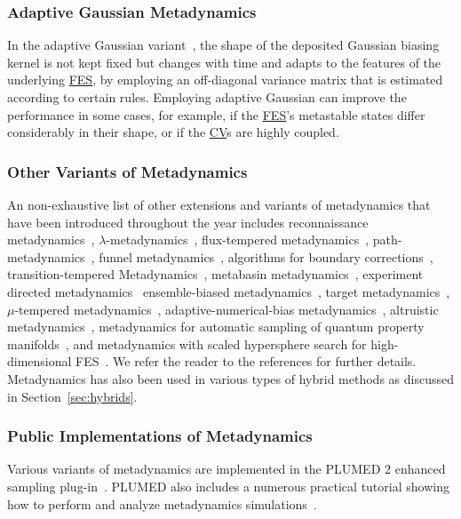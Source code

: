 \documentclass[9pt,review]{livecoms}
\begin{document}
\subsubsection{Adaptive Gaussian Metadynamics}
In the adaptive Gaussian variant~\cite{Branduardi-JCTC-2012}, the shape of the deposited Gaussian biasing kernel is not kept fixed but changes with time and adapts to the features of the underlying \hyperlink{ref:FES} {FES}, by employing an off-diagonal variance matrix that is estimated according to certain rules. Employing adaptive Gaussian can improve the performance in some cases, for example, if the \hyperlink{ref:FES} {FES}'s metastable states differ considerably in their shape, or if the \hyperlink{ref:CV} {CV}s are highly coupled.

\subsubsection{Other Variants of Metadynamics}
\label{sec:metad_variants}
An non-exhaustive list of other extensions and variants of metadynamics that have been introduced throughout the year includes
reconnaissance metadynamics~\cite{10.1073/pnas.1011511107},
$\lambda$-metadynamics~\cite{10.1021/jz200808x},
flux-tempered metadynamics~\cite{Singh-JStatPhys-2011,Singh-JCTC-2012},
path-metadynamics~\cite{10.1103/physrevlett.109.020601,10.1063/1.5027392},
funnel metadynamics~\cite{10.1073/pnas.1303186110,10.1038/s41596-020-0342-4},
algorithms for boundary corrections~\cite{McGovern-JCP-2013},
transition-tempered Metadynamics~\cite{Dama-JCTC-2014}, metabasin metadynamics~\cite{10.1021/acs.jctc.5b00907},
experiment directed metadynamics~\cite{White_EDM_2015}
ensemble-biased metadynamics~\cite{Marinelli_EnsembleBiased_2015},
target metadynamics~\cite{GilLey_TargetMetaD_2016},
$\mu$-tempered metadynamics~\cite{10.1063/1.4937939},
adaptive-numerical-bias metadynamics~\cite{10.1002/jcc.25066},
altruistic metadynamics~\cite{10.1021/acs.jpcb.6b00087,10.1063/1.4978939},
metadynamics for automatic sampling of quantum property manifolds~\cite{Lindner_ASQPM-MetaD_2019},
and
metadynamics with scaled hypersphere search for high-dimensional FES~\cite{Mitsuta_SHS-MetaD_JCTC2020}.
We refer the reader to the references for further details. Metadynamics has also been used in various types of hybrid methods as discussed in Section~\ref{sec:hybrids}.

\subsubsection{Public Implementations of Metadynamics}
Various variants of metadynamics are implemented in the PLUMED 2 enhanced sampling plug-in~\cite{Bonomi-CPC-2009,Tribello2014,plumed-nest}. PLUMED also includes a numerous practical tutorial showing how to perform and analyze metadynamics simulations~\cite{plumed_masterclass}.
\end{document}

